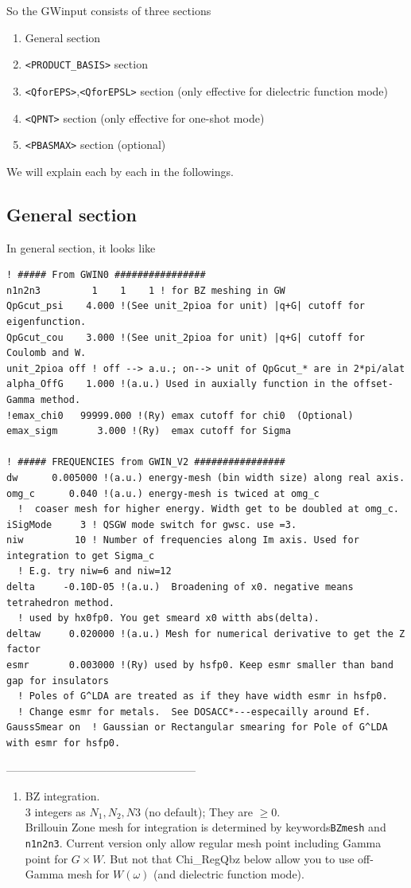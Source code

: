 \documentclass[a4paper,10pt,epsf,fleqn]{article}
\newcommand{\fx}[1]{\subsection{\sf #1\index{\sf #1}}}
\newcommand{\keyw}[1]{\fbox{\tt #1}}
\begin{document}
{So the {\sf GWinput} consists of three sections \\
\begin{enumerate}
 \item General section 
 \item \verb#<PRODUCT_BASIS># section
 \item \verb#<QforEPS>#,\verb#<QforEPSL># section (only effective for
dielectric function mode)
 \item \verb#<QPNT># section (only effective for one-shot mode)
 \item \verb#<PBASMAX># section (optional)
\end{enumerate}
We will explain each by each in the followings.

\newpage
\fx{General section}
In general section, it looks like
\begin{verbatim}
! ##### From GWIN0 ################ 
n1n2n3         1    1    1 ! for BZ meshing in GW 
QpGcut_psi    4.000 !(See unit_2pioa for unit) |q+G| cutoff for eigenfunction.
QpGcut_cou    3.000 !(See unit_2pioa for unit) |q+G| cutoff for Coulomb and W.
unit_2pioa off ! off --> a.u.; on--> unit of QpGcut_* are in 2*pi/alat 
alpha_OffG    1.000 !(a.u.) Used in auxially function in the offset-Gamma method.
!emax_chi0   99999.000 !(Ry) emax cutoff for chi0  (Optional)
emax_sigm       3.000 !(Ry)  emax cutoff for Sigma

! ##### FREQUENCIES from GWIN_V2 ################ 
dw      0.005000 !(a.u.) energy-mesh (bin width size) along real axis.
omg_c      0.040 !(a.u.) energy-mesh is twiced at omg_c
  !  coaser mesh for higher energy. Width get to be doubled at omg_c.
iSigMode     3 ! QSGW mode switch for gwsc. use =3.
niw         10 ! Number of frequencies along Im axis. Used for integration to get Sigma_c
  ! E.g. try niw=6 and niw=12
delta     -0.10D-05 !(a.u.)  Broadening of x0. negative means tetrahedron method.
  ! used by hx0fp0. You get smeard x0 witth abs(delta).
deltaw     0.020000 !(a.u.) Mesh for numerical derivative to get the Z factor
esmr       0.003000 !(Ry) used by hsfp0. Keep esmr smaller than band gap for insulators
  ! Poles of G^LDA are treated as if they have width esmr in hsfp0. 
  ! Change esmr for metals.  See DOSACC*---especailly around Ef.
GaussSmear on  ! Gaussian or Rectangular smearing for Pole of G^LDA with esmr for hsfp0.
\end{verbatim}

---------------------------------------------------\\
\begin{enumerate}
\item BZ integration.\\
\keyw{n1n2n3} 3 integers as $N_1,N_2,N3$ (no default); They are $\ge 0$. \\
Brillouin Zone mesh for integration
is determined by keywords{\tt BZmesh} and {\tt n1n2n3}. 
Current version only allow regular mesh point including Gamma point
for $G \times W$. But not that Chi\_RegQbz below allow you to use
off-Gamma mesh for $W(\omega)$ (and dielectric function mode).


\end{enumerate}}
\end{document}
